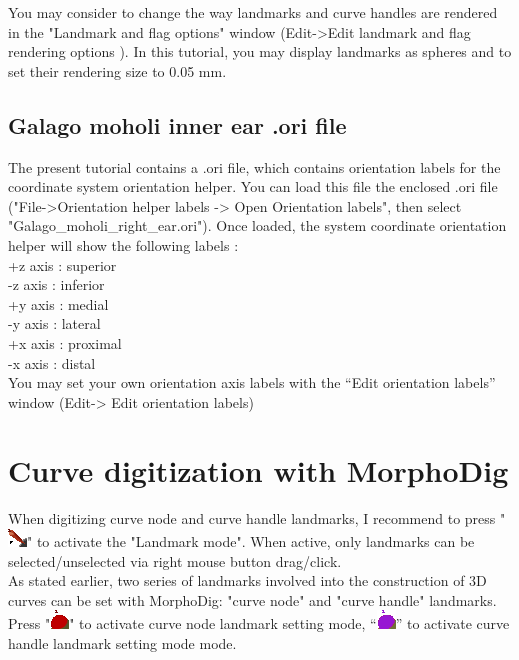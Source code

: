 \documentclass[12pt, a4paper]{book}
\begin{document}
You may consider to change the way landmarks and curve handles are rendered in the "Landmark and flag options" window (Edit->Edit landmark and flag rendering options ). In this tutorial, you may display landmarks as spheres and to set their rendering size to 0.05 mm.\\

\subsection{Galago moholi inner ear .ori file}
The present tutorial contains a .ori file, which contains orientation labels for the coordinate system
orientation helper. You can load this file the enclosed .ori file ("File->Orientation helper labels -> Open Orientation labels", then select
"Galago\_moholi\_right\_ear.ori"). Once loaded, the system coordinate orientation helper will show the following
labels :\\
+z axis : superior\\
-z axis : inferior\\
+y axis : medial\\
-y axis : lateral\\
+x axis : proximal\\
-x axis : distal\\
You may set your own orientation axis labels with the “Edit orientation labels” window (Edit-> Edit orientation labels)

\section{Curve digitization with MorphoDig}


When digitizing curve node and curve handle landmarks, I recommend to press "\includegraphics[scale=0.7]{../images/04/Landmarks2.png}" to activate the "Landmark mode". When active, only landmarks can be selected/unselected via right mouse button drag/click. \\

As stated earlier, two series of landmarks involved into the construction of 3D curves can be set with MorphoDig: "curve node" and "curve handle" landmarks.
Press "\includegraphics[scale=0.7]{../images/04/curve_nodes.png}" to activate curve node landmark setting mode, “\includegraphics[scale=0.7]{../images/04/curve_handles.png}” to activate curve handle landmark setting mode mode.\\
\end{document}
